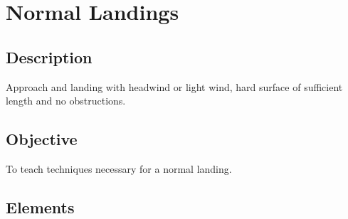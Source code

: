\section{Normal Landings}

\subsection{Description}

Approach and landing with headwind or light wind, hard surface of sufficient
length and no obstructions.

\subsection{Objective}

To teach techniques necessary for a normal landing.

\subsection{Elements}

